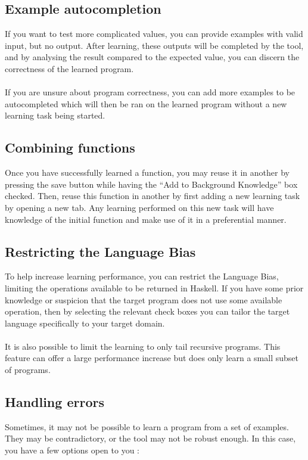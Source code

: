 \subsection{Example autocompletion}

If you want to test more complicated values, you can provide examples with valid input, but no output. After learning, these outputs will be completed by the tool, and by analysing the result compared to the expected value, you can discern the correctness of the learned program. \\ \\
If you are unsure about program correctness, you can add more examples to be autocompleted which will then be ran on the learned program without a new learning task being started.

\subsection{Combining functions}

Once you have successfully learned a function, you may reuse it in another by pressing the save button while having the ``Add to Background Knowledge'' box checked. Then, reuse this function in another by first adding a new learning task by opening a new tab. Any learning performed on this new task will have knowledge of the initial function and make use of it in a preferential manner.

\subsection{Restricting the Language Bias}
To help increase learning performance, you can restrict the Language Bias, limiting the operations available to be returned in Haskell. If you have some prior knowledge or suspicion that the target program does not use some available operation, then by selecting the relevant check boxes you can tailor the target language specifically to your target domain. \\ \\
It is also possible to limit the learning to only tail recursive programs. This feature can offer a large performance increase but does only learn a small subset of programs.

\subsection{Handling errors}

Sometimes, it may not be possible to learn a program from a set of examples. They may be contradictory, or the tool may not be robust enough. In this case, you have a few options open to you :

